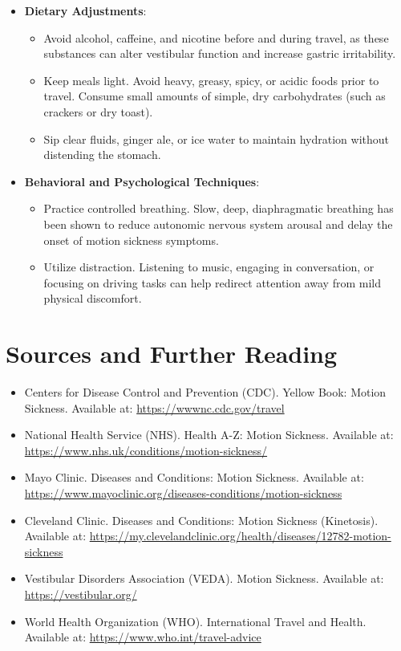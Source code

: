 \begin{itemize}
\begin{itemize}
        \item Avoid sensory triggers. Stay away from strong food odors, fuel fumes, and cigarette smoke, which can quickly trigger or worsen nausea.
    \end{itemize}
    \item \textbf{Dietary Adjustments}:
    \begin{itemize}
        \item Avoid alcohol, caffeine, and nicotine before and during travel, as these substances can alter vestibular function and increase gastric irritability.
        \item Keep meals light. Avoid heavy, greasy, spicy, or acidic foods prior to travel. Consume small amounts of simple, dry carbohydrates (such as crackers or dry toast).
        \item Sip clear fluids, ginger ale, or ice water to maintain hydration without distending the stomach.
    \end{itemize}
    \item \textbf{Behavioral and Psychological Techniques}:
    \begin{itemize}
        \item Practice controlled breathing. Slow, deep, diaphragmatic breathing has been shown to reduce autonomic nervous system arousal and delay the onset of motion sickness symptoms.
        \item Utilize distraction. Listening to music, engaging in conversation, or focusing on driving tasks can help redirect attention away from mild physical discomfort.
    \end{itemize}
\end{itemize}

\section*{Sources and Further Reading}
\begin{itemize}
    \item Centers for Disease Control and Prevention (CDC). Yellow Book: Motion Sickness. Available at: \url{https://wwwnc.cdc.gov/travel}
    \item National Health Service (NHS). Health A-Z: Motion Sickness. Available at: \url{https://www.nhs.uk/conditions/motion-sickness/}
    \item Mayo Clinic. Diseases and Conditions: Motion Sickness. Available at: \url{https://www.mayoclinic.org/diseases-conditions/motion-sickness}
    \item Cleveland Clinic. Diseases and Conditions: Motion Sickness (Kinetosis). Available at: \url{https://my.clevelandclinic.org/health/diseases/12782-motion-sickness}
    \item Vestibular Disorders Association (VEDA). Motion Sickness. Available at: \url{https://vestibular.org/}
    \item World Health Organization (WHO). International Travel and Health. Available at: \url{https://www.who.int/travel-advice}
\end{itemize}
